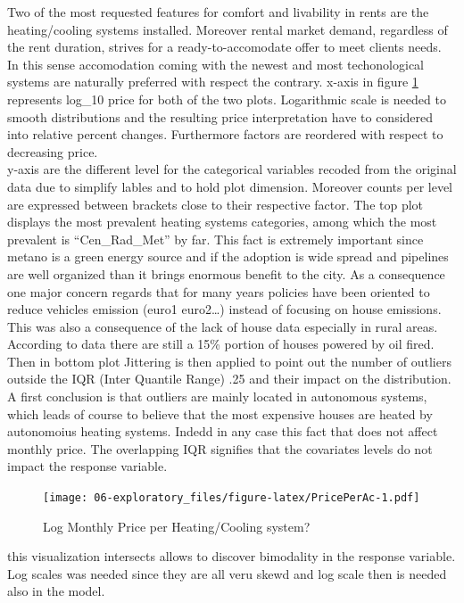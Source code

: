 \documentclass[
  12pt,
  a4paper,
  oneside]{book}
\theoremstyle{definition}
\theoremstyle{definition}
\theoremstyle{definition}
\theoremstyle{remark}
\begin{document}
Two of the most requested features for comfort and livability in rents are the heating/cooling systems installed. Moreover rental market demand, regardless of the rent duration, strives for a ready-to-accomodate offer to meet clients needs. In this sense accomodation coming with the newest and most techonological systems are naturally preferred with respect the contrary.
x-axis in figure \ref{fig:PricePerAc} represents log\_10 price for both of the two plots. Logarithmic scale is needed to smooth distributions and the resulting price interpretation have to considered into relative percent changes. Furthermore factors are reordered with respect to decreasing price.\\
y-axis are the different level for the categorical variables recoded from the original data due to simplify lables and to hold plot dimension. Moreover counts per level are expressed between brackets close to their respective factor.
The top plot displays the most prevalent heating systems categories, among which the most prevalent is ``Cen\_Rad\_Met'' by far. This fact is extremely important since metano is a green energy source and if the adoption is wide spread and pipelines are well organized than it brings enormous benefit to the city. As a consequence one major concern regards that for many years policies have been oriented to reduce vehicles emission (euro1 euro2\ldots) instead of focusing on house emissions. This was also a consequence of the lack of house data especially in rural areas. According to data there are still a 15\% portion of houses powered by oil fired.
Then in bottom plot Jittering is then applied to point out the number of outliers outside the IQR (Inter Quantile Range) .25 and their impact on the distribution. A first conclusion is that outliers are mainly located in autonomous systems, which leads of course to believe that the most expensive houses are heated by autonomoius heating systems. Indedd in any case this fact that does not affect monthly price. The overlapping IQR signifies that the covariates levels do not impact the response variable.

\begin{figure}
\centering
\texttt{[image: 06-exploratory\_files/figure-latex/PricePerAc-1.pdf]}
\caption{\label{fig:PricePerAc}Log Monthly Price per Heating/Cooling system?}
\end{figure}

this visualization intersects allows to discover bimodality in the response variable. Log scales was needed since they are all veru skewd and log scale then is needed also in the model.
\end{document}
